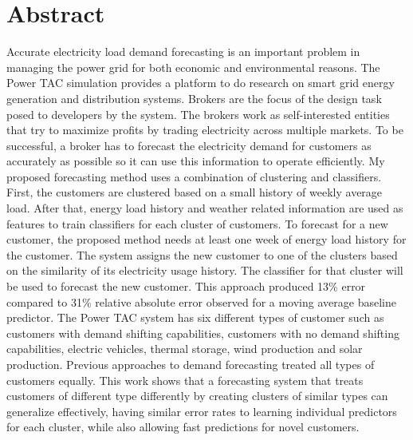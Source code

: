 

\chapter*{Abstract}

Accurate electricity load demand forecasting is an important problem in managing the power grid for both economic and environmental reasons. The Power TAC simulation provides a platform to do research on smart grid energy generation and distribution systems. Brokers are the focus of the design task posed to developers by the system. The brokers work as self-interested entities that try to maximize profits by trading electricity across multiple markets. To be successful, a broker has to forecast  the electricity demand for customers as accurately as possible so it can use this information to operate efficiently. My proposed forecasting method uses a combination of clustering and classifiers. First, the customers are clustered based on a small history of weekly average load. After that, energy load history and weather related information are used as features to train classifiers for each cluster of customers. To forecast for a new customer, the proposed method needs at least one week of energy load history for the customer. The system assigns the  new customer to one of the clusters based on the similarity of its electricity usage history. The classifier for that cluster will be used to forecast the new customer. This approach produced 13\% error compared to 31\% relative absolute error observed for a moving average baseline predictor. The Power TAC system has six different types of customer such as customers with demand shifting capabilities, customers with no demand shifting capabilities, electric vehicles, thermal storage, wind production and solar production. Previous approaches to demand forecasting treated all types of customers equally. This work shows that a forecasting system that treats customers of different type differently by creating clusters of similar types can generalize effectively, having similar error rates to learning individual predictors for each cluster, while also allowing fast predictions for novel customers.
